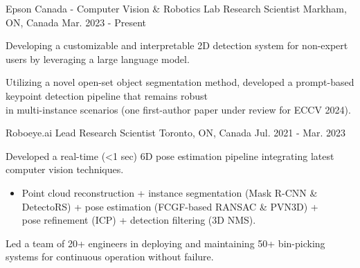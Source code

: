 

\vspace*{0.05cm}
\begin{cventries}

\cventry
{Epson Canada - Computer Vision \& Robotics Lab} %
{Research Scientist} %
{Markham, ON, Canada} %
{Mar. 2023 - Present} %
{ %
\begin{cvitems}
\item {Developing a customizable and interpretable 2D detection system for non-expert users by leveraging a large language model.}
\item {Utilizing a novel open-set object segmentation method, developed a prompt-based keypoint detection pipeline that remains robust \\
in multi-instance scenarios (one first-author paper under review for ECCV 2024).}
\end{cvitems}
}
\cventry
{Roboeye.ai} %
{Lead Research Scientist} %
{Toronto, ON, Canada} %
{Jul. 2021 - Mar. 2023} %
{ %
\begin{cvitems}
\item {Developed a real-time (<1 sec) 6D pose estimation pipeline integrating latest computer vision techniques.}
\begin{itemize}[label=$\cdot$,leftmargin=0.7em]
\item{Point cloud reconstruction + instance segmentation (Mask R-CNN \& DetectoRS) + pose estimation (FCGF-based RANSAC \& PVN3D) + \\
pose refinement (ICP) + detection filtering (3D NMS).}
\end{itemize}
\item {Led a team of 20+ engineers in deploying and maintaining 50+ bin-picking systems for continuous operation without failure.}
\end{cvitems}
}
\end{cventries}
